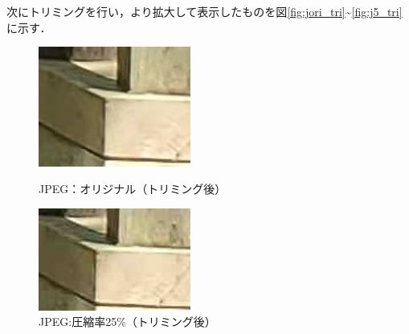 \documentclass[a4paper,11pt]{bxjsarticle}
\begin{document}
次にトリミングを行い，より拡大して表示したものを図\ref{fig:jori_tri}\textasciitilde\ref{fig:j5_tri}に示す．

\begin{figure}[htbp]
  \begin{minipage}{0.5\hsize}
   \begin{center}
    \includegraphics[width=50mm]{sample_tri.jpg}
   \end{center}
   \caption{JPEG：オリジナル（トリミング後）}
   \label{fig:jori_tri}
  \end{minipage}
  \begin{minipage}{0.5\hsize}
   \begin{center}
    \includegraphics[width=50mm]{sample_j25_tri.jpg}
   \end{center}
   \caption{JPEG:圧縮率25\%（トリミング後）}
   \label{fig:j25_tri}
  \end{minipage}
 \end{figure}
\end{document}
